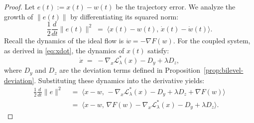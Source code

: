 \documentclass{article}
\newcommand{\1}{\mathbf{1}}
\begin{document}
\begin{proof}
    Let $e(t) := x(t) - w(t)$ be the trajectory error. We analyze the growth of $\|e(t)\|$ by differentiating its squared norm:
    \[
    \frac{1}{2}\frac{d}{dt}\|e(t)\|^2
    \;=\; \langle x(t)-w(t),\, \dot x(t) - \dot w(t) \rangle.
    \]
    Recall the dynamics of the ideal flow is $\dot w = -\nabla F(w)$. For the coupled system, as derived in \eqref{eq:xdot}, the dynamics of $x(t)$ satisfy:
    \[
    \dot x \;=\; -\nabla_x \mathcal L_\lambda^*(x) - D_y + \lambda D_z,
    \]
    where $D_y$ and $D_z$ are the deviation terms defined in Proposition~\ref{prop:bilevel-deviation}.
    Substituting these dynamics into the derivative yields:
    \begin{align*}
        \frac{1}{2}\frac{d}{dt}\|e\|^2
        \;&=\; \langle x-w, \, -\nabla_x \mathcal L_\lambda^*(x) - D_y + \lambda D_z + \nabla F(w) \rangle \\
        \;&=\; \langle x-w, \, \nabla F(w) - \nabla_x \mathcal L_\lambda^*(x) - D_y + \lambda D_z \rangle.
    \end{align*}


\end{proof}
\end{document}
